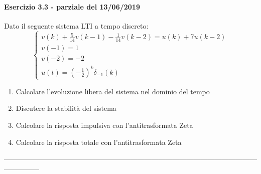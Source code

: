 \documentclass[12pt,a4paper]{article}
\begin{document}
	\paragraph*{Esercizio 3.3 - parziale del 13/06/2019} Dato il seguente sistema LTI a tempo discreto:
	\[
		\begin{cases}
		v(k) + \frac{5}{14}v(k-1) -\frac{1}{14}v(k-2) = u(k) + 7u(k-2) \\
		v(-1) = 1 \\
		v(-2) = -2 \\
		u(t) = \left(-\frac{1}{2}\right)^k\delta_{-1}(k)
		\end{cases}
	\]
	\begin{enumerate}
		\item Calcolare l'evoluzione libera del sistema nel dominio del tempo
		\item Discutere la stabilit\`a del sistema
		\item Calcolare la risposta impulsiva con l'antitrasformata Zeta
		\item Calcolare la risposta totale con l'antitrasformata Zeta
	\end{enumerate}
	---------------------------------------------------------------------------------------------------------------------------\\
\end{document}
